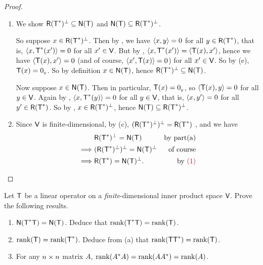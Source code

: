 \begin{proof} \ 

\begin{enumerate}
\item We show \(\textsf{R}(\textsf{T}^*)^{\perp} \subseteq \textsf{N}(\textsf{T})\) and \(\textsf{N}(\textsf{T}) \subseteq \textsf{R}(\textsf{T}^*)^{\perp}\).

So suppose \(x \in \textsf{R}(\textsf{T}^*)^{\perp}\).
Then by , we have \(\left< x, y \right> = 0\) for all \(y \in \textsf{R}(\textsf{T}^*)\), that is, \(\left< x, \textsf{T}^*(x') \right> = 0\) for all \(x' \in \textsf{V}\).
But by , \(\left< x, \textsf{T}^*(x') \right> = \left< \textsf{T}(x), x' \right>\), hence we have \(\left< \textsf{T}(x), x' \right> = 0\) (and of course, \(\left< x', \textsf{T}(x) \right> = 0\)) for all \(x' \in \textsf{V}\).
So by (e), \(\textsf{T}(x) = 0_{_{\textsf{V}}}\).
So by definition \(x \in \textsf{N}(\textsf{T})\), hence \(\textsf{R}(\textsf{T}^*)^{\perp} \subseteq \textsf{N}(\textsf{T})\).

Now suppose \(x \in \textsf{N}(\textsf{T})\).
Then in particular, \(\textsf{T}(x) = 0_{_{\textsf{V}}}\), so \(\left< \textsf{T}(x), y \right> = 0\) for all \(y \in \textsf{V}\).
Again by , \(\left< x, \textsf{T}^*(y) \right> = 0\) for all \(y \in \textsf{V}\), that is, \(\left< x, y' \right> = 0\) for all \(y' \in \textsf{R}(\textsf{T}^*)\).
So by , \(x \in \textsf{R}(\textsf{T}^*)^{\perp}\), hence \(\textsf{N}(\textsf{T}) \subseteq \textsf{R}(\textsf{T}^*)^{\perp}\).

\item Since \(\textsf{V}\) is finite-dimensional, by (c), \((\textsf{R}(\textsf{T}^*)^{\perp})^{\perp} = \textsf{R}(\textsf{T}^*)\) , and we have
\begin{align*}
    & \RANGE(\T^*)^{\perp} = \NULLT & \text{by part(a)} \\
    \implies & (\RANGE(\T^*)^{\perp})^{\perp} = \NULLT^{\perp} & \text{of course} \\
    \implies & \RANGE(\T^*) = \NULLT^{\perp}. & \text{by \MAROON{(1)}}
\end{align*}
\end{enumerate}
\end{proof}

\begin{exercise} \label{exercise 6.3.13}
Let \(\textsf{T}\) be a linear operator on a \emph{finite}-dimensional inner product space \(\textsf{V}\).
Prove the following results.
\begin{enumerate}
\item \(\textsf{N}(\textsf{T}^*\textsf{T}) = \textsf{N}(\textsf{T})\).
Deduce that \(\mathrm{rank}(\textsf{T}^*\textsf{T}) = \mathrm{rank}(\textsf{T})\).
\item \(\mathrm{rank}(\textsf{T}) = \mathrm{rank}(\textsf{T}^*)\).
Deduce from (a) that \(\mathrm{rank}(\textsf{T}\textsf{T}^*) = \mathrm{rank}(\textsf{T})\).
\item For any \(n \times n\) matrix \(A\), \(\mathrm{rank}(A^*A) = \mathrm{rank}(AA^*) = \mathrm{rank}(A)\).
\end{enumerate}
\end{exercise}

